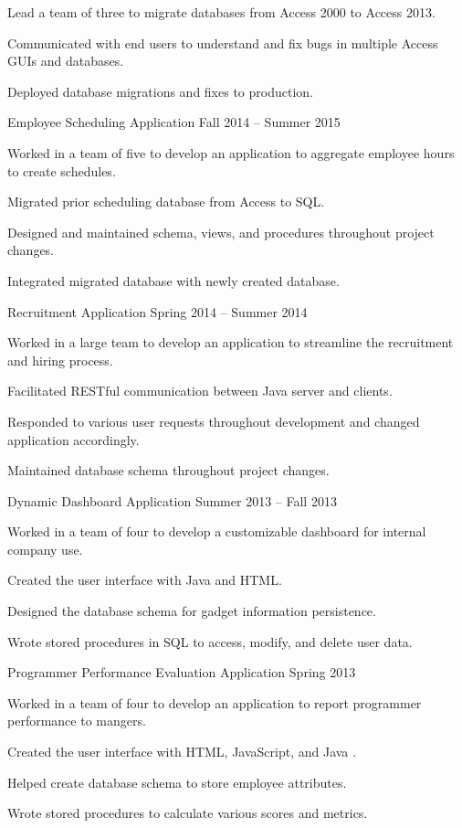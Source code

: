 \documentclass{marvinkassabian_resume}
\begin{document}
					\resumesublistbegin
						\item Lead a team of three to migrate databases from Access 2000 to Access 2013.
						\item Communicated with end users to understand and fix bugs in multiple Access GUIs and databases.
						\item Deployed database migrations and fixes to production.
					\resumesublistend
				\item[] \subsectiondate
						{Employee Scheduling Application}
						{Fall 2014 – Summer 2015}
					\resumesublistbegin
						\item Worked in a team of five to develop an application to aggregate employee hours to create schedules.
						\item Migrated prior scheduling database from Access to SQL.
						\item Designed and maintained schema, views, and procedures throughout project changes.
						\item Integrated migrated database with newly created database.
					\resumesublistend
				\item[] \subsectiondate
						{Recruitment Application}
						{Spring 2014 – Summer 2014}
					\resumesublistbegin
						\item Worked in a large team to develop an application to streamline the recruitment and hiring process.
						\item Facilitated RESTful communication between Java server and clients.
						\item Responded to various user requests throughout development and changed application accordingly.
						\item Maintained database schema throughout project changes.
					\resumesublistend
				\item[] \subsectiondate
						{Dynamic Dashboard Application}
						{Summer 2013 – Fall 2013}
					\resumesublistbegin
						\item Worked in a team of four to develop a customizable dashboard for internal company use.
						\item Created the user interface with Java and HTML.
						\item Designed the database schema for gadget information persistence.
						\item Wrote stored procedures in SQL to access, modify, and delete user data.
					\resumesublistend
				\item[] \subsectiondate
						{Programmer Performance Evaluation Application}
						{Spring 2013}
					\resumesublistbegin
						\item Worked in a team of four to develop an application to report programmer performance to mangers.
						\item Created the user interface with HTML, JavaScript, and Java .
						\item Helped create database schema to store employee attributes.
						\item Wrote stored procedures to calculate various scores and metrics.
					\resumesublistend
			\resumesublistend
\end{document}
